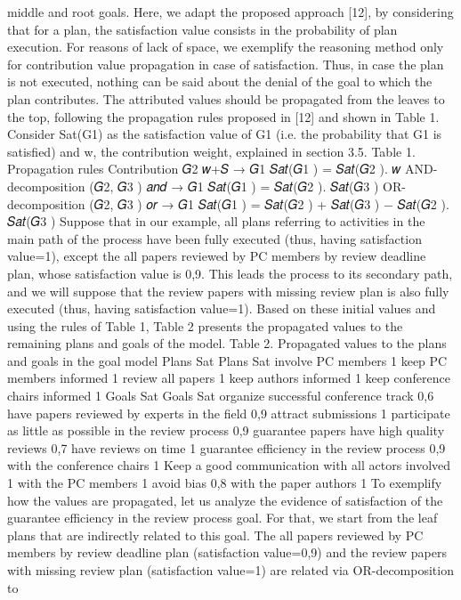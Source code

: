 middle and root goals. Here, we adapt the proposed approach [12], by considering that
for a plan, the satisfaction value consists in the probability of plan execution. For reasons of lack of space, we exemplify the reasoning method only for contribution value
propagation in case of satisfaction. Thus, in case the plan is not executed, nothing can
be said about the denial of the goal to which the plan contributes. The attributed values
should be propagated from the leaves to the top, following the propagation rules proposed in [12] and shown in Table 1. Consider Sat(G1) as the satisfaction value of G1
(i.e. the probability that G1 is satisfied) and w, the contribution weight, explained in
section 3.5.
Table 1. Propagation rules
Contribution 𝐺2
𝑤+𝑆
→ 𝐺1
𝑆𝑎𝑡(𝐺1
) = 𝑆𝑎𝑡(𝐺2
). 𝑤
AND-decomposition (𝐺2, 𝐺3
)
𝑎𝑛𝑑
→ 𝐺1
𝑆𝑎𝑡(𝐺1
) = 𝑆𝑎𝑡(𝐺2
). 𝑆𝑎𝑡(𝐺3
)
OR-decomposition (𝐺2, 𝐺3
)
𝑜𝑟
→ 𝐺1
𝑆𝑎𝑡(𝐺1
) = 𝑆𝑎𝑡(𝐺2
) + 𝑆𝑎𝑡(𝐺3
)
− 𝑆𝑎𝑡(𝐺2
). 𝑆𝑎𝑡(𝐺3
)
Suppose that in our example, all plans referring to activities in the main path of the
process have been fully executed (thus, having satisfaction value=1), except the all papers reviewed by PC members by review deadline plan, whose satisfaction value
is 0,9. This leads the process to its secondary path, and we will suppose that the review
papers with missing review plan is also fully executed (thus, having satisfaction
value=1). Based on these initial values and using the rules of Table 1, Table 2 presents
the propagated values to the remaining plans and goals of the model.
Table 2. Propagated values to the plans and goals in the goal model
Plans Sat Plans Sat
involve PC members 1 keep PC members informed 1
review all papers 1 keep authors informed 1
keep conference chairs informed 1
Goals Sat Goals Sat
organize successful conference
track
0,6 have papers reviewed by experts
in the field
0,9
attract submissions 1 participate as little as possible in
the review process
0,9
guarantee papers have high quality
reviews
0,7 have reviews on time 1
guarantee efficiency in the review
process
0,9 with the conference chairs 1
Keep a good communication with
all actors involved
1 with the PC members 1
avoid bias 0,8 with the paper authors 1
To exemplify how the values are propagated, let us analyze the evidence of satisfaction of the guarantee efficiency in the review process goal. For that, we start from
the leaf plans that are indirectly related to this goal. The all papers reviewed by PC
members by review deadline plan (satisfaction value=0,9) and the review papers
with missing review plan (satisfaction value=1) are related via OR-decomposition to
